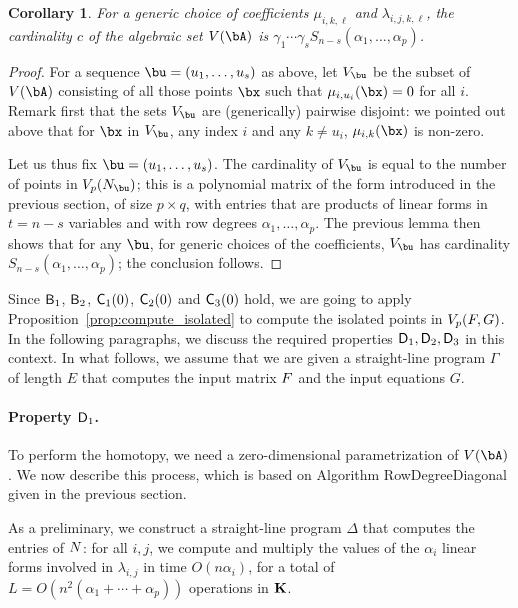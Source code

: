\documentclass[12pt]{article}
\newtheorem{corollary}[definition]{Corollary}
\begin{document}
\begin{corollary}\label{coro:complete}
  For a generic choice of coefficients $\mu_{i,k,\ell}$ and
  $\lambda_{i,j,k,\ell}$, the cardinality $c$ of the algebraic set
  $V(\bA)$ is $\gamma_1 \cdots \gamma_s S_{n-s}(\alpha_1,\dots,\alpha_p)$.
\end{corollary}
\begin{proof}
  For a sequence $\bu=(u_1,\dots,u_s)$ as above, let $V_\bu$ be the
  subset of $V(\bA)$ consisting of all those points $\bx$ such that
  $\mu_{i,u_i}(\bx)=0$ for all $i$. Remark first that the sets $V_\bu$
  are (generically) pairwise disjoint: we pointed out above that for
  $\bx$ in $V_\bu$, any index $i$ and any $k \ne u_i$,
  $\mu_{i,k}(\bx)$ is non-zero.
  
  Let us thus fix $\bu=(u_1,\dots,u_s)$. The cardinality of $V_\bu$ is
  equal to the number of points in $V_p(\mN_\bu)$; this is a
  polynomial matrix of the form introduced in the previous section, of
  size $p \times q$, with entries that are products of linear forms in
  $t=n-s$ variables and with row degrees
  $\alpha_1,\dots,\alpha_p$. The previous lemma then shows that for
  any $\bu$, for generic choices of the coefficients, $V_\bu$ has
  cardinality $S_{n-s}(\alpha_1,\dots,\alpha_p)$; the conclusion
  follows.
\end{proof}



Since $\mathsf{B}_1$, $\mathsf{B}_2$, $\mathsf{C}_1(0)$, $\mathsf{C}_2(0)$ and
$\mathsf{C}_3(0)$ hold, we are going to apply
Proposition~\ref{prop:compute_isolated} to compute the isolated points
in $V_{p}({F},G)$. In the following paragraphs, we discuss the required
properties $\mathsf{D}_1,\mathsf{D}_2,\mathsf{D}_3$ in this context. In what follows,
we assume that we are given a straight-line program $\Gamma$ of length
$E$ that computes the input matrix ${F}$ and the input equations $G$.

\paragraph{Property $\mathsf{D}_1$.} To perform the homotopy, we need a zero-dimensional parametrization of
$V(\bA)$. We now describe this process, which is based on Algorithm
          {\sf RowDegreeDiagonal} given in the previous section.

As a preliminary, we construct a straight-line program $\Delta$ that
computes the entries of ${N}$: for all $i,j$, we compute and multiply
the values of the $\alpha_i$ linear forms involved in $\lambda_{i,j}$
in time $O(n \alpha_i)$, for a total of $L=O(n^2 (\alpha_1+\cdots+\alpha_p))$
operations in $\mathbf{K}$.
\end{document}

